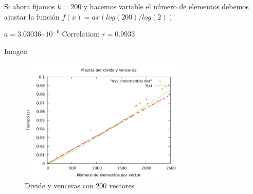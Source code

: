 \begin{frame}
	\begin{block}
	
	Si ahora fijamos $k=200$ y hacemos variable el n\'umero de elementos debemos ajustar 			la funci\'on $f(x) = ax(log(200)/log(2))$

	\begin{center}
	$a               = 3.03036\cdot 10^{-6}$
	Correlation:  $r = 0.9933$
	\end{center}
	\end{block}
\end{frame}

\begin{frame}{Imagen}
	\begin{block}{ }
	
	\begin{figure}[h] 
	\centering
	\includegraphics[width=0.7\textwidth]{../Obligatorio/Graficas/dyv_nelementos.png}
	\caption{Divide y venceras con 200 vectores} 
	\label{fig:d_nelementos} 
	\end{figure}
	
	\end{block}
\end{frame}


